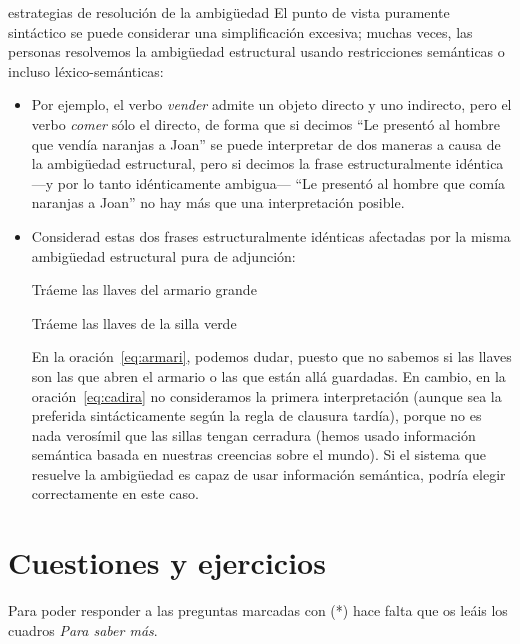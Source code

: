 \begin{persabermes}{estrategias de resolución de la ambigüedad}
El punto de vista puramente sintáctico se puede considerar una simplificación excesiva; muchas veces, las personas resolvemos la ambigüedad estructural usando restricciones semánticas o incluso léxico-semánticas: \begin{itemize} \item Por ejemplo, el verbo \emph{vender} admite un objeto directo y uno indirecto, pero el verbo \emph{comer} sólo el directo, de forma que si decimos ``Le presentó al hombre que vendía naranjas a Joan'' se puede interpretar de dos maneras a causa de la ambigüedad estructural, pero si decimos la frase estructuralmente idéntica ---y por lo tanto idénticamente ambigua--- ``Le presentó al hombre que comía naranjas a Joan'' no hay más que una interpretación posible. \item Considerad estas dos frases estructuralmente idénticas afectadas por la misma ambigüedad estructural pura de adjunción: \begin{exemple} \label{eq:armari} Tráeme las llaves del armario grande \end{exemple} \begin{exemple} \label{eq:cadira} Tráeme las llaves de la silla verde \end{exemple} En la oración~\ref{eq:armari}, podemos dudar, puesto que no sabemos si las llaves son las que abren el armario o las que están allá guardadas. En cambio, en la oración~\ref{eq:cadira} no consideramos la primera interpretación (aunque sea la preferida sintácticamente según la regla de clausura tardía), porque no es nada verosímil que las sillas tengan cerradura (hemos usado información semántica basada en nuestras creencias sobre el mundo). Si el sistema que resuelve la ambigüedad es capaz de usar información semántica, podría elegir correctamente en este caso. \end{itemize} \end{persabermes} 

\section{Cuestiones y ejercicios} Para poder responder a las preguntas marcadas con (*) hace falta que os leáis los cuadros \emph{Para saber más}. 

